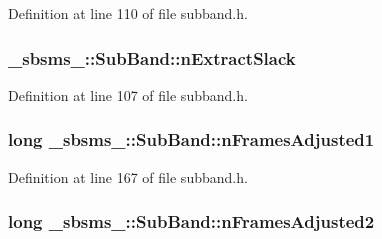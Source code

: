 Definition at line 110 of file subband.\+h.

\subsubsection[{\texorpdfstring{n\+Extract\+Slack}{nExtractSlack}}]{ \+\_\+sbsms\+\_\+\+::\+Sub\+Band\+::n\+Extract\+Slack\hspace{0.3cm}{\ttfamily [protected]}}\hypertarget{class__sbsms___1_1_sub_band_aa717eaac6adc81277581ae7b4734a12a}{}\label{class__sbsms___1_1_sub_band_aa717eaac6adc81277581ae7b4734a12a}


Definition at line 107 of file subband.\+h.

\subsubsection[{\texorpdfstring{n\+Frames\+Adjusted1}{nFramesAdjusted1}}]{\setlength{\rightskip}{0pt plus 5cm}long \+\_\+sbsms\+\_\+\+::\+Sub\+Band\+::n\+Frames\+Adjusted1\hspace{0.3cm}{\ttfamily [protected]}}\hypertarget{class__sbsms___1_1_sub_band_af2f8e93eb7770756ba9aa778c1a81d17}{}\label{class__sbsms___1_1_sub_band_af2f8e93eb7770756ba9aa778c1a81d17}


Definition at line 167 of file subband.\+h.

\subsubsection[{\texorpdfstring{n\+Frames\+Adjusted2}{nFramesAdjusted2}}]{\setlength{\rightskip}{0pt plus 5cm}long \+\_\+sbsms\+\_\+\+::\+Sub\+Band\+::n\+Frames\+Adjusted2\hspace{0.3cm}{\ttfamily [protected]}}\hypertarget{class__sbsms___1_1_sub_band_a1b959e104a308afc4a7444a968c2eb72}{}\label{class__sbsms___1_1_sub_band_a1b959e104a308afc4a7444a968c2eb72}


